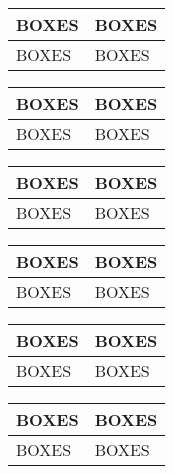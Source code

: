 \documentclass [spanish,12pt]{article}
\begin{document}
\vspace{.1in}

\begin{tabular}{|@{}l|l@{}|} %
\hline
BOXES & BOXES \\ \hline
BOXES & BOXES \\ \hline
\end{tabular}

\vspace{.1in}

\begin{tabular}{|@{}l@{}|l@{}|} %
\hline
BOXES & BOXES \\ \hline
BOXES & BOXES \\ \hline
\end{tabular}

\vspace{.1in}

\begin{tabular}{|@{}l@{}|@{}l@{}|} %
\hline
BOXES & BOXES \\ \hline
BOXES & BOXES \\ \hline
\end{tabular}

\vspace{.2in}

\begin{tabular}{||l||l||} %
\hline \hline
BOXES & BOXES \\ \hline \hline
BOXES & BOXES \\ \hline \hline
\end{tabular}

\vspace{.1in}

\begin{tabular}{||@{}l||l@{}||} %
\hline \hline
BOXES & BOXES \\ \hline \hline
BOXES & BOXES \\ \hline \hline
\end{tabular}

\vspace{.1in}

\begin{tabular}{||@{}l@{}||l@{}||} %
\hline \hline
BOXES & BOXES \\ \hline \hline
BOXES & BOXES \\ \hline \hline
\end{tabular}

\vspace{.1in}
\end{document}
